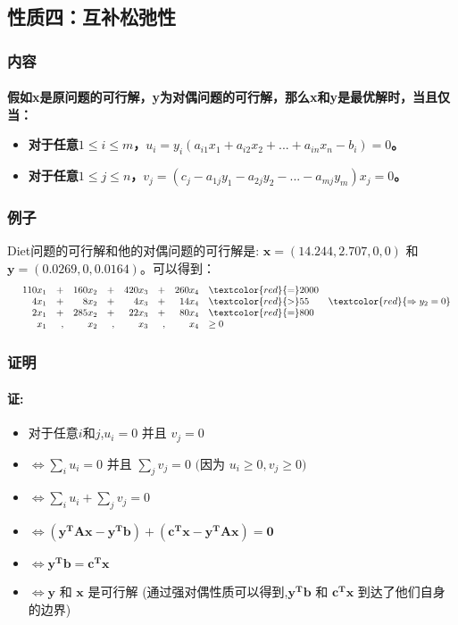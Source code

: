 	\subsection{性质四：互补松弛性}
	\subsubsection{内容}
	\paragraph{}\textbf{假如x是原问题的可行解，y为对偶问题的可行解，那么x和y是最优解时，当且仅当：}
		\begin{itemize}
			\item \textbf{对于任意$1\leq i \leq m$，$u_i =   y_i ( a_{i1}x_{1} + a_{i2}x_{2} + ... +a_{in}x_{n}  - b_i) = 0$。}
			\item \textbf{对于任意$1\leq j \leq n$，$v_j =  ( c_j - a_{1j}y_{1} - a_{2j}y_{2} - ... - a_{mj}y_{m} )x_j = 0$。}
		\end{itemize}
	\subsubsection{例子}
		{\sc Diet}问题的可行解和他的对偶问题的可行解是: $\mathbf{x}=(14.244, 2.707, 0, 0 )$ 和 $\mathbf{y}=(0.0269, 0, 0.0164)$。可以得到：
		\[
		\begin{array}{rrrrrrrrlr}
 			& 110x_1 &+& 160 x_2 &+& 420 x_3 &+& 260 x_4 & \textcolor{red}{=} 2000 & \\
      		& 4 x_1  &+& 8 x_2   &+& 4 x_3   &+& 14 x_4  & \textcolor{red}{>} 55 & \textcolor{red}{\Rightarrow y_2=0}\\
      		&  2 x_1 &+& 285 x_2 &+& 22 x_3  &+& 80 x_4  & \textcolor{red}{=} 800 & \\
      		& x_1    &,& x_2     &,& x_3     &,&    x_4  & \geq 0 \\ 		
		\end{array} \nonumber
		\] 
	\subsubsection{证明}
	\paragraph{证:}
		\begin{itemize}
		\item 对于任意$i$和$j$,$ u_i = 0 \text{ 并且 }  v_j = 0 $
		\item $ \Leftrightarrow \sum_i u_i = 0 \text{ 并且 } \sum_j v_j = 0 \text{ (因为 } u_i \geq 0, v_j \geq 0\text{)} $ 
		\item $ \Leftrightarrow  \sum_i u_i + \sum_j v_j = 0 $
		\item $\Leftrightarrow  \mathbf{ ( y^T A x - y^T b )+ ( c^T x - y^T A x ) = 0}  $
		\item $\Leftrightarrow  \mathbf{ y^T b = c^T x } $
		\item $\Leftrightarrow  \mathbf{y}  \text{ 和 } \mathbf{x}$  是可行解 (通过强对偶性质可以得到,$\mathbf{y^T b}$ 和 $\mathbf{c^T x}$ 到达了他们自身的边界)	
		\end{itemize}
